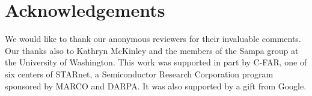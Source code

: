 \documentclass[pageno,nohyperref]{jpaper}
\begin{document}
\section*{Acknowledgements}

We would like to thank our anonymous reviewers for their invaluable comments.
Our thanks also to Kathryn McKinley and the members of the Sampa group at the University of Washington.
This work was supported in part by C-FAR, one of six centers of STARnet, a
Semiconductor Research Corporation program sponsored by MARCO and DARPA.
It was also supported by a gift from Google.



{}

\end{document}
